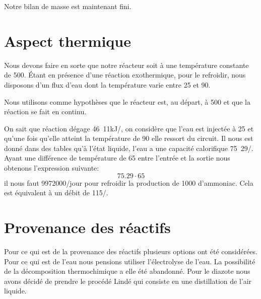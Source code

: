 Notre bilan de masse est maintenant fini.

\section{Aspect thermique}

Nous devons faire en sorte que notre réacteur soit à une température constante de \unit{500}{\celsius}. Étant en présence d'une réaction exothermique, pour le refroidir, nous disposons d'un flux d'eau dont la température varie entre \unit{25}{\celsius} et \unit{90}{\celsius}.


Nous utilisons comme hypothèses que le réacteur est, au départ, à \unit{500}{\celsius} et que la réaction se fait en continu.


On sait que réaction dégage \unit{46.11}{kJ/\mole}, on considère que l'eau est injectée à \unit{25}{\celsius} et qu'une fois qu'elle atteint la température de \unit{90}{\celsius} elle ressort du circuit. 
Il nous est donné dans des tables qu'à l'état liquide, l'eau a une capacité calorifique \unit{75.29}{\joule/\kelvin \cdot \mole}. Ayant une différence de température de \unit{65}{\celsius} entre l'entrée et la sortie nous obtenons l'expression suivante:
$$ 75.29\cdot 65 $$%
il nous faut \unit{9972000}{\litre/jour} pour refroidir la production de \unit{1000}{\tonne} d'ammoniac. Cela est équivalent à un débit de \unit{115}{\litre/\second}.


\section{Provenance des réactifs}
 
Pour ce qui est de la provenance des réactifs plusieurs options ont été considérées. Pour ce qui est de l'eau nous pensions utiliser l'électrolyse de l'eau. La possibilité de la décomposition thermochimique a elle été abandonné. Pour le diazote nous avons décidé de prendre le procédé Lindé qui consiste en une distillation de l'air liquide.




%
